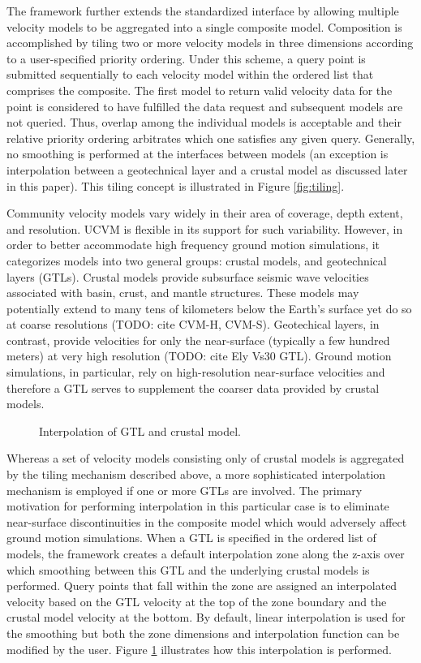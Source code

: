 The framework further extends the standardized interface by allowing multiple velocity models to be aggregated into a single composite model. Composition is accomplished by tiling two or more velocity models in three dimensions according to a user-specified priority ordering. Under this scheme, a query point is submitted sequentially to each velocity model within the ordered list that comprises the composite. The first model to return valid velocity data for the point is considered to have fulfilled the data request and subsequent models are not queried. Thus, overlap among the individual models is acceptable and their relative priority ordering arbitrates which one satisfies any given query. Generally, no smoothing is performed at the interfaces between models (an exception is interpolation between a geotechnical layer and a crustal model as discussed later in this paper). This tiling concept is illustrated in Figure \ref{fig:tiling}.

Community velocity models vary widely in their area of coverage, depth extent, and resolution. UCVM is flexible in its support for such variability. However, in order to better accommodate high frequency ground motion simulations, it categorizes models into two general groups: crustal models, and geotechnical layers (GTLs). Crustal models provide subsurface seismic wave velocities associated with basin, crust, and mantle structures. These models may potentially extend to many tens of kilometers below the Earth's surface yet do so at coarse resolutions (TODO: cite CVM-H, CVM-S). Geotechical layers, in contrast, provide velocities for only the near-surface (typically a few hundred meters) at very high resolution (TODO: cite Ely Vs30 GTL). Ground motion simulations, in particular, rely on high-resolution near-surface velocities and therefore a GTL serves to supplement the coarser data provided by crustal models.
\begin{figure}
\centering
{}
\caption{Interpolation of GTL and crustal model.}\label{fig:interpolation}
\end{figure}

Whereas a set of velocity models consisting only of crustal models is aggregated by the tiling mechanism described above, a more sophisticated interpolation mechanism is employed if one or more GTLs are involved. The primary motivation for performing interpolation in this particular case is to eliminate near-surface discontinuities in the composite model which would adversely affect ground motion simulations. When a GTL is specified in the ordered list of models, the framework creates a default interpolation zone along the z-axis over which smoothing between this GTL and the underlying crustal models is performed. Query points that fall within the zone are assigned an interpolated velocity based on the GTL velocity at the top of the zone boundary and the crustal model velocity at the bottom. By default, linear interpolation is used for the smoothing but both the zone dimensions and interpolation function can be modified by the user. Figure \ref{fig:interpolation} illustrates how this interpolation is performed. 

